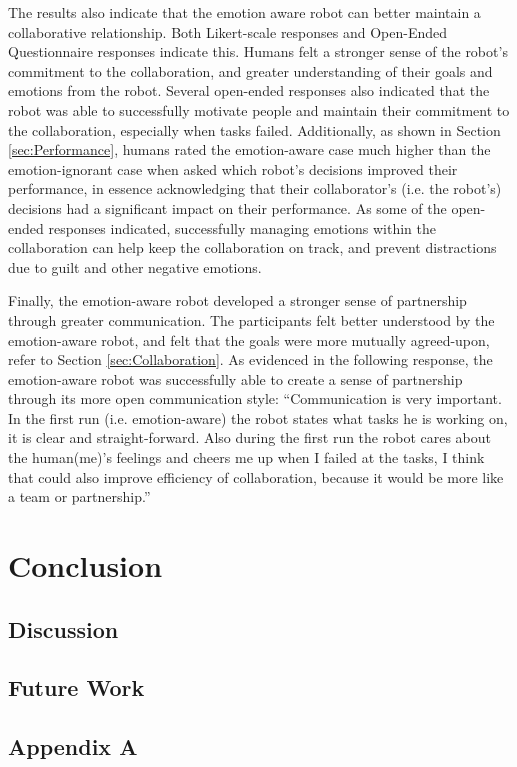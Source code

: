 \documentclass[12pt]{report}
\begin{document}
The results also indicate that the emotion aware robot can better maintain a
collaborative relationship. Both Likert-scale responses and Open-Ended
Questionnaire responses indicate this. Humans felt a stronger sense of the
robot's commitment to the collaboration, and greater understanding of their
goals and emotions from the robot. Several open-ended responses also indicated
that the robot was able to successfully motivate people and maintain their
commitment to the collaboration, especially when tasks failed. Additionally, as
shown in Section \ref{sec:Performance}, humans rated the emotion-aware case much
higher than the emotion-ignorant case when asked which robot's decisions
improved their performance, in essence acknowledging that their collaborator's
(i.e. the robot's) decisions had a significant impact on their performance. As
some of the open-ended responses indicated, successfully managing emotions
within the collaboration can help keep the collaboration on track, and prevent
distractions due to guilt and other negative emotions.

Finally, the emotion-aware robot developed a stronger sense of  partnership
through greater communication. The participants felt better understood by the
emotion-aware robot, and felt that the goals were more mutually agreed-upon,
refer to Section \ref{sec:Collaboration}. As evidenced in the following
response, the emotion-aware robot was successfully able to create a sense of
partnership through its more open communication style: ``Communication is very
important. In the first run (i.e. emotion-aware) the robot states what tasks he
is working on, it is clear and straight-forward. Also during the first run the
robot cares about the human(me)'s feelings and cheers me up when I failed at the
tasks, I think that could also improve efficiency of collaboration, because it
would be more like a team or partnership.''

\chapter{Conclusion}
\label{ch:conclusion}

\section{Discussion}

\section{Future Work}

\pagebreak





\begin{appendices}
\chapter*{Appendix A}
\label{apdx:constraints}

\end{appendices}
\end{document}
